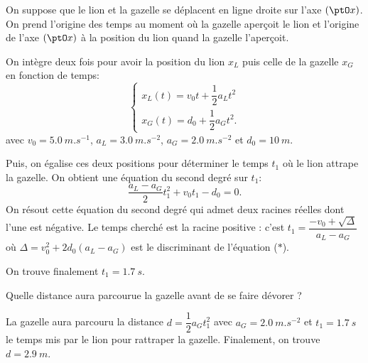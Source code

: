 \begin{corrige}
	On suppose que le lion et la gazelle se déplacent en ligne droite sur 
	l'axe $(\ptO x)$. On prend l'origine des temps au moment où la gazelle 
	aperçoit le lion et l'origine de l'axe $(\ptO x)$ à la position du lion quand 
	la gazelle l'aperçoit. 
	
	On intègre deux fois pour avoir la position du 
	lion $x_L$ puis celle de la gazelle $x_G$ en fonction de temps: 
	\[
	\begin{cases}
		x_L(t) = v_0t + \dfrac{1}{2}a_Lt^2\\[2mm]
		x_G(t) = d_0 + \dfrac{1}{2}a_Gt^2.
	\end{cases}
	\]
avec $v_0 =\SI{5,0}{m.s^{-1}}$, $a_L=\SI{3,0}{m.s^{-2}}$, $a_G=\SI{2,0}{m.s^{-2}}$ et $d_0=\SI{10}{m}$. 

	Puis, on égalise ces 
	deux positions pour déterminer le temps $t_1$ où le lion attrape la 
	gazelle.  On obtient une équation du second degré sur $t_1$: 
	\[
	\dfrac{a_L-a_G}{2}t_1^2 + v_0 t_1 - d_0 = 0. \tag{$\ast$}
	\]
	On résout cette équation du second degré qui admet deux racines réelles 
	dont l'une est négative. Le temps cherché est la racine 
	positive : c'est $t_1 = \dfrac{-v_0 + \sqrt{\Delta}}{a_L-a_G}$ où $\Delta = 
	v_0^2 + 2d_0(a_L-a_G)$ est le discriminant de l'équation ($\ast$).
	
	On trouve finalement $t_1 = \SI{1,7}{s}$.
\end{corrige}




\begin{enonce}
	Quelle distance aura parcourue la gazelle avant de se faire dévorer ?
\end{enonce}


\begin{corrige}
	La gazelle aura parcouru la distance $d = \dfrac{1}{2}a_G t_1^2$ avec 
	$a_G = \SI{2,0}{m.s^{-2}} $ et $t_1 = \SI{1,7}{s}$ le temps mis par le lion 
	pour rattraper la gazelle. Finalement, on trouve  $d =\SI{2,9}{m}$.
\end{corrige}


\finEntrainement







